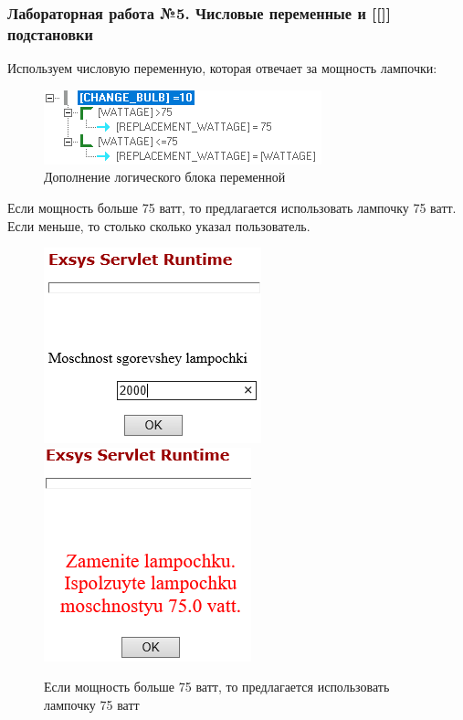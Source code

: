 \documentclass[14pt,a4paper,report]{report}
\begin{document}
\subsubsection{Лабораторная работа №5. Числовые переменные и [[]] подстановки}

Используем числовую переменную, которая отвечает за мощность лампочки:

\begin{figure}[h!]
	\centering
	\includegraphics[scale = 1.1]{images/5_1.png}
	\caption{Дополнение логического блока переменной}
\end{figure}

Если мощность больше 75 ватт, то предлагается использовать лампочку 75 ватт. Если меньше, то столько сколько указал пользователь.

\begin{figure}[ht!]
	\includegraphics[width=.40\textwidth]{images/5_2.png}\hfill
	\includegraphics[width=.45\textwidth]{images/5_3.png}
	\caption{Если мощность больше 75 ватт, то предлагается использовать лампочку 75 ватт}
\end{figure}

\clearpage
\end{document}
